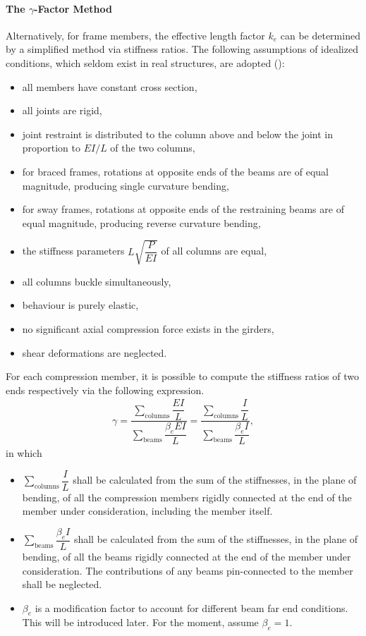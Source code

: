 \paragraph{The $\gamma$-Factor Method}
Alternatively, for frame members, the effective length factor $k_e$ can be determined by a simplified method via stiffness ratios. The following assumptions of idealized conditions, which seldom exist in real structures, are adopted ():
\begin{itemize}
\item all members have constant cross section,
\item all joints are rigid,
\item joint restraint is distributed to the column above and below the joint in proportion to $EI/L$ of the two columns,
\item for braced frames, rotations at opposite ends of the beams are of equal magnitude, producing single curvature bending,
\item for sway frames, rotations at opposite ends of the restraining beams are of equal magnitude, producing reverse curvature bending,
\item the stiffness parameters $L\sqrt{\dfrac{P}{EI}}$ of all columns are equal,
\item all columns buckle simultaneously,
\item behaviour is purely elastic,
\item no significant axial compression force exists in the girders,
\item shear deformations are neglected.
\end{itemize}

For each compression member, it is possible to compute the stiffness ratios of two ends respectively via the following expression.
\begin{gather}\label{eq:be}
\gamma=\dfrac{\displaystyle\sum_{\text{columns}}\dfrac{EI}{L}}{\displaystyle\sum_{\text{beams}}\dfrac{\beta_eEI}{L}}=\dfrac{\displaystyle\sum_{\text{columns}}\dfrac{I}{L}}{\displaystyle\sum_{\text{beams}}\dfrac{\beta_eI}{L}},
\end{gather}
in which
\begin{itemize}
\item {} $\displaystyle\sum_{\text{columns}}\dfrac{I}{L}$ shall be calculated from the sum of the stiffnesses, in the plane of bending, of all the compression members rigidly connected at the end of the member under consideration, including the member itself.
\item {} $\displaystyle\sum_{\text{beams}}\dfrac{\beta_eI}{L}$ shall be calculated from the sum of the stiffnesses, in the plane of bending, of all the beams rigidly connected at the end of the member under consideration. The contributions of any beams pin-connected to the member shall be neglected.
\item $\beta_e$ is a modification factor to account for different beam far end conditions. This will be introduced later. For the moment, assume $\beta_e=1$.
\end{itemize}

